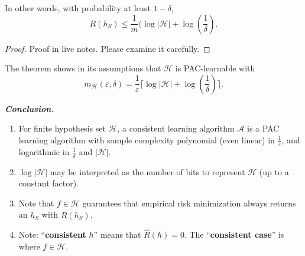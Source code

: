 \documentclass{article}
\begin{document}
In other words, with probability at least $1 - \delta$,
\begin{equation}
  R(h_S) \leq \frac{1}{m}(\log |\mathcal{H}| + \log \left( \frac{1}{\delta} \right).
\end{equation}

\begin{proof}
  Proof in live notes. Please examine it carefully.
\end{proof}

The theorem shows in its assumptions that $\mathcal{H}$ is PAC-learnable with
\begin{equation}
  m_{\mathcal{H}}(\varepsilon, \delta) = \frac{1}{\varepsilon} \lceil \log |\mathcal{H}| + \log \left( \frac{1}{\delta} \right)  \rceil .
\end{equation}

\textbf{\textit{Conclusion.}}

\begin{enumerate}
\item For finite hypothesis set $\mathcal{H}$, a consistent learning algorithm $\mathcal{A}$ is a PAC learning algorithm with sample complexity polynomial (even linear) in $\frac{1}{\varepsilon}$, and logarithmic in $\frac{1}{\delta}$ and $\left| \mathcal{H} \right|$.
\item $\log \left| \mathcal{H} \right|$ may be interpreted as the number of bits to represent $\mathcal{H}$ (up to a constant factor).
\item Note that $f \in \mathcal{H}$ guarantees that empirical risk minimization always returns an $h_S$ with $\hat{R}(h_S)$.
\item Note: ``\textbf{consistent} $h$'' means that $\hat{R}(h) = 0 $. The ``\textbf{consistent case}'' is where $f \in \mathcal{H}$.
\end{enumerate}

\printindex
\end{document}
